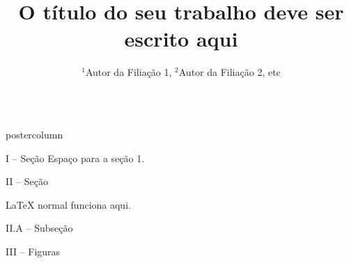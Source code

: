 \documentclass[final,hyperref={pdfpagelabels=false}]{beamer}
\title{\Huge O título do seu trabalho deve ser escrito aqui}
\author{\Large $^1$Autor da Filiação 1, $^2$Autor da Filiação 2, etc}
\institute[UNESP, ETC]{$^1$Universidade Estadual Paulista - Brasil, $^2$Filiação 2 - Brasil}
\newlength{\columnheight}
\begin{document}
\begin{frame}
	\begin{columns}
		\begin{column}{.45\textwidth}
			\begin{beamercolorbox}[center,wd=\textwidth]{postercolumn}
				\begin{minipage}[T]{.95\textwidth}  %
					\parbox[t][\columnheight]{\textwidth}{ %
												
						\begin{block}
							{\vspace{-6pt} \large I -- Seção}
							Espaço para a seção 1.          
						\end{block}
						\vspace*{14pt}
												
						\begin{block}{\vspace{-6pt} \large II -- Seção}
							\begin{itemize}
																
								{\small \item LaTeX normal funciona aqui.}
																
																
							\end{itemize}
						\end{block}
												
						\vspace*{14pt}
												
						\begin{block}{\vspace{-6pt} \large II.A -- Subseção}
						\end{block}
												
						\begin{block}{\vspace{-6pt} \large III -- Figuras}
														

\end{block}}
\end{minipage}
\end{beamercolorbox}
\end{column}
\end{columns}
\end{frame}
\end{document}
